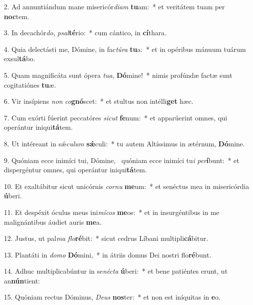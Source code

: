 2. Ad annuntiándum mane misericór\textit{di}\textit{am} \textbf{tu}am:~*  et veritátem tuam per \textbf{noc}tem.\

3. In decachór\textit{do}, \textit{psal}\textbf{té}rio:~*  cum cántico, in \textbf{cí}thara.\

4. Quia delectásti me, Dómine, in fac\textit{tú}\textit{ra} \textbf{tu}a:~*  et in opéribus mánuum tuárum exsul\textbf{tá}bo.\

5. Quam magnificáta sunt ópera \textit{tu}\textit{a}, \textbf{Dó}mine!~*  nimis profúndæ factæ sunt cogitatiónes \textbf{tu}æ.\

6. Vir insípiens \textit{non} \textit{co}\textbf{gnó}scet:~*  et stultus non intélli\textbf{get} hæc.\

7. Cum exórti fúerint peccatóres \textit{sic}\textit{ut} \textbf{fe}num:~*  et apparúerint omnes, qui operántur iniqui\textbf{tá}tem.\

8. Ut intéreant in sǽ\textit{cu}\textit{lum} \textbf{sǽ}culi:~*  tu autem Altíssimus in ætérnum, \textbf{Dó}mine.\

9. Quóniam ecce inimíci tui, Dómine, \dag\  quóniam ecce inimíci tu\textit{i} \textit{per}\textbf{í}bunt:~*  et dispergéntur omnes, qui operántur iniqui\textbf{tá}tem.\

10. Et exaltábitur sicut unicórnis \textit{cor}\textit{nu} \textbf{me}um:~*  et senéctus mea in misericórdia \textbf{ú}beri.\

11. Et despéxit óculus meus ini\textit{mí}\textit{cos} \textbf{me}os:~*  et in insurgéntibus in me malignántibus áudiet auris \textbf{me}a.\

12. Justus, ut pal\textit{ma} \textit{flo}\textbf{ré}bit:~*  sicut cedrus Líbani multipli\textbf{cá}bitur.\

13. Plantáti in \textit{do}\textit{mo} \textbf{Dó}mini,~*  in átriis domus Dei nostri flo\textbf{ré}bunt.\

14. Adhuc multiplicabúntur in se\textit{néc}\textit{ta} \textbf{ú}beri:~*  et bene patiéntes erunt, ut an\textbf{nún}tient:\

15. Quóniam rectus Dóminus, \textit{De}\textit{us} \textbf{nos}ter:~*  et non est iníquitas in \textbf{e}o.\

